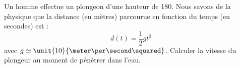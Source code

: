 
\begin{exercice}\label{exosmath-0374}

    Un homme effectue un plongeon d'une hauteur de \unit{180}{\meter}. Nous savons de la physique que la distance (en mètres) parcourue en fonction du temps (en secondes) est :
    \begin{equation}
        d(t)=\frac{ 1 }{2}gt^2
    \end{equation}
    avec \( g\simeq\unit{10}{\meter\per\second\squared}\). Calculer la vitesse du plongeur au moment de pénétrer dans l'eau. 

\end{exercice}
